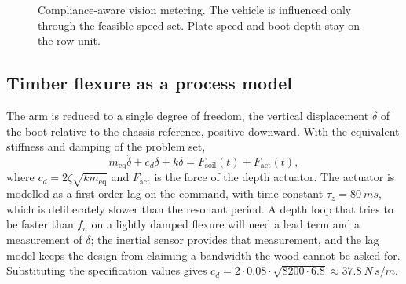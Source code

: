 \begin{figure}[ht]
\centering
{}
\caption{Compliance-aware vision metering. The vehicle is influenced only through the feasible-speed set. Plate speed and boot depth stay on the row unit.}
\label{fig:cavm}
\end{figure}

\subsection{Timber flexure as a process model}

The arm is reduced to a single degree of freedom, the vertical displacement \(\delta\) of the boot relative to the chassis reference, positive downward. With the equivalent stiffness and damping of the problem set,
\begin{equation}
\label{eq:sddot}
m_{\mathrm{eq}}\ddot{\delta} + c_d \dot{\delta} + k\delta = F_{\mathrm{soil}}(t) + F_{\mathrm{act}}(t),
\end{equation}
where \(c_d = 2\zeta\sqrt{k m_{\mathrm{eq}}}\) and \(F_{\mathrm{act}}\) is the force of the depth actuator. The actuator is modelled as a first-order lag on the command, with time constant \(\tau_z=\SI{80}{ms}\), which is deliberately slower than the resonant period. A depth loop that tries to be faster than \(f_n\) on a lightly damped flexure will need a lead term and a measurement of \(\dot{\delta}\); the inertial sensor provides that measurement, and the lag model keeps the design from claiming a bandwidth the wood cannot be asked for. Substituting the specification values gives \(c_d = 2\cdot 0.08\cdot\sqrt{8200\cdot 6.8}\approx \SI{37.8}{N\,s/m}\).

